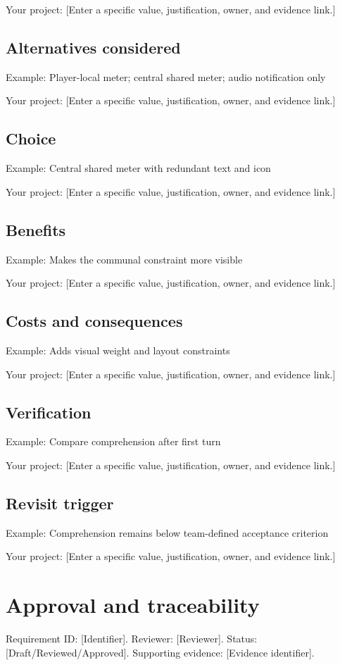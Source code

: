 \documentclass[11pt]{article}
\begin{document}
Your project: [Enter a specific value, justification, owner, and evidence link.]


\subsection{Alternatives considered}
Example: Player-local meter; central shared meter; audio notification only

Your project: [Enter a specific value, justification, owner, and evidence link.]


\subsection{Choice}
Example: Central shared meter with redundant text and icon

Your project: [Enter a specific value, justification, owner, and evidence link.]


\subsection{Benefits}
Example: Makes the communal constraint more visible

Your project: [Enter a specific value, justification, owner, and evidence link.]


\subsection{Costs and consequences}
Example: Adds visual weight and layout constraints

Your project: [Enter a specific value, justification, owner, and evidence link.]


\subsection{Verification}
Example: Compare comprehension after first turn

Your project: [Enter a specific value, justification, owner, and evidence link.]


\subsection{Revisit trigger}
Example: Comprehension remains below team-defined acceptance criterion

Your project: [Enter a specific value, justification, owner, and evidence link.]


\section{Approval and traceability}
Requirement ID: [Identifier]. Reviewer: [Reviewer]. Status: [Draft/Reviewed/Approved]. Supporting evidence: [Evidence identifier].
\end{document}
